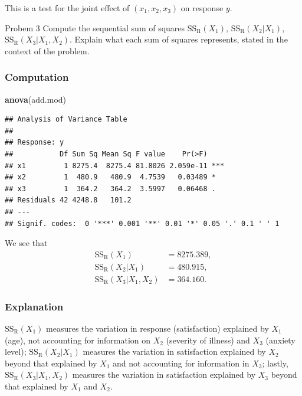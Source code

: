 \documentclass[
]{article}
\newenvironment{Shaded}{\begin{snugshade}}{\end{snugshade}}
\newcommand{\FunctionTok}[1]{\textcolor[rgb]{0.13,0.29,0.53}{\textbf{#1}}}
\newcommand{\NormalTok}[1]{#1}
\begin{document}
This is a test for the joint effect of \((x_1,x_2,x_3)\) on response
\(y\).

\begin{tcolorbox}[split=\f]
Probem 3
\tcblower
Compute the sequential sum of squares $\mathrm{SS_{R}}(X_1)$, $\mathrm{SS_{R}}(X_2|X_1)$, $\mathrm{SS_{R}}(X_3|X_1,X_2)$.
Explain what each sum of squares represents, stated in the context of the problem.
\end{tcolorbox}

\hypertarget{computation-1}{%
\subsubsection{Computation}\label{computation-1}}

\begin{Shaded}
\begin{Highlighting}[]
\FunctionTok{anova}\NormalTok{(add.mod)}
\end{Highlighting}
\end{Shaded}

\begin{verbatim}
## Analysis of Variance Table
## 
## Response: y
##           Df Sum Sq Mean Sq F value    Pr(>F)    
## x1         1 8275.4  8275.4 81.8026 2.059e-11 ***
## x2         1  480.9   480.9  4.7539   0.03489 *  
## x3         1  364.2   364.2  3.5997   0.06468 .  
## Residuals 42 4248.8   101.2                      
## ---
## Signif. codes:  0 '***' 0.001 '**' 0.01 '*' 0.05 '.' 0.1 ' ' 1
\end{verbatim}

We see that \begin{align*}
  \mathrm{SS_{R}}(X_1)         &= 8275.389,\\
  \mathrm{SS_{R}}(X_2|X_1)     &= 480.915,\\
  \mathrm{SS_{R}}(X_3|X_1,X_2) &= 364.160.
\end{align*}

\hypertarget{explanation-2}{%
\subsubsection{Explanation}\label{explanation-2}}

\(\mathrm{SS_{R}}(X_1)\) measures the variation in response
(satisfaction) explained by \(X_1\) (age), not accounting for
information on \(X_2\) (severity of illness) and \(X_3\) (anxiety
level); \(\mathrm{SS_{R}}(X_2|X_1)\) measures the variation in
satisfaction explained by \(X_2\) beyond that explained by \(X_1\) and
not accounting for information in \(X_3\); lastly,
\(\mathrm{SS_{R}}(X_3|X_1,X_2)\) measures the variation in satisfaction
explained by \(X_3\) beyond that explained by \(X_1\) and \(X_2\).
\end{document}

